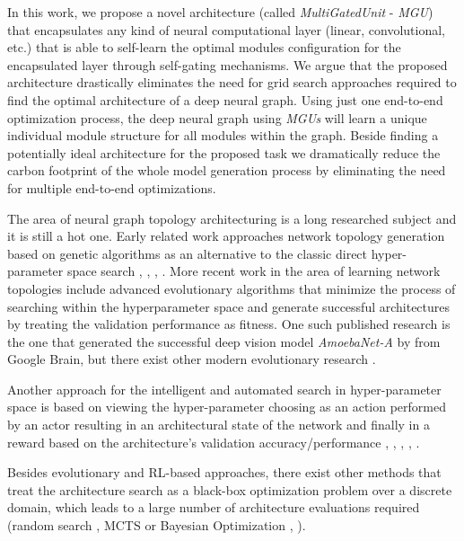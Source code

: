 \documentclass[conference]{IEEEtran}
\begin{document}
In this work, we propose a novel architecture (called \textit{MultiGatedUnit} - \textit{MGU}) that encapsulates any kind of neural computational layer (linear, convolutional, etc.) that is able to self-learn the optimal modules configuration for the encapsulated layer through self-gating mechanisms.  We argue that the proposed architecture drastically eliminates the need for grid search approaches required to find the optimal architecture of a deep neural graph.  Using just one end-to-end optimization process, the deep neural graph using \textit{MGUs} will learn a unique individual module structure for all modules within the graph. Beside finding a potentially ideal architecture for the proposed task we dramatically reduce the carbon footprint of the whole model generation process by eliminating the need for multiple end-to-end optimizations.

The area of neural graph topology architecturing is a long researched subject and it is still a hot one. Early related work approaches network topology generation based on genetic algorithms as an alternative to the classic direct hyper-parameter space search \cite{MillerG.F.;ToddP.M.;Hegde1989}, \cite{Stanley2002}, \cite{Wierstra2005}, \cite{Floreano2008}. More recent work in the area of learning network topologies include advanced evolutionary algorithms that minimize the process of searching within the hyperparameter space and generate successful architectures by treating the validation performance as fitness. One such published research is the one that generated the successful deep vision model \textit{AmoebaNet-A} by \cite{Real2018} from Google Brain, but there exist other modern evolutionary research \cite{Suganuma2018}.

Another approach for the intelligent and automated search in hyper-parameter space is based on viewing the hyper-parameter choosing as an action performed by an actor resulting in an architectural state of the network and finally in a reward based on the architecture's validation accuracy/performance \cite{Baker2017}, \cite{Zoph2017}, \cite{Zoph2018}, \cite{Pham2018}, \cite{Zhong2018}. 

Besides evolutionary and RL-based approaches, there exist other methods that treat the architecture search as a black-box optimization problem over a discrete domain, which leads to a large number of architecture evaluations required (random search \cite{Bergstra2012}, MCTS \cite{Negrinho2017} or Bayesian Optimization \cite{Snoek2012}, \cite{Kandasamy2018}).
\end{document}
